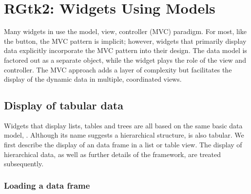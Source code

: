 \chapter{RGtk2: Widgets Using Models}
\label{sec:RGtk2:widgets-with-models}



Many widgets in \GTK\/ use the model, view, controller (MVC)
paradigm. For most, like the button, the MVC pattern is implicit;
however, widgets that primarily display data explicitly incorporate
the MVC pattern into their design. The data model is factored out as a
separate object, while the widget plays the role of the view and
controller. The MVC approach adds a layer of complexity but
facilitates the display of the dynamic data in multiple, coordinated
views.

\section{Display of tabular data}
\label{sec:RGtk2:tabular-heirarchical-data}

Widgets that display lists, tables and trees are all based on the same
basic data model, . Although its name suggests a
hierarchical structure,  is also tabular. We first
describe the display of an \R\/ data frame in a list or table
view. The display of hierarchical data, as well as further details of
the  framework, are treated subsequently.

\subsection{Loading a data frame}
\label{sec:tabular-stores-tree}

